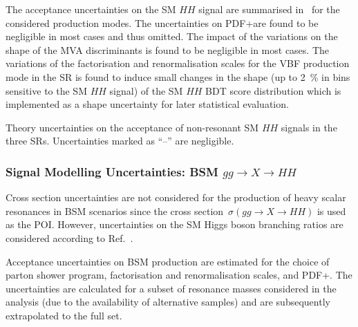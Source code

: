 The acceptance uncertainties on the SM $HH$ signal are summarised
in~ for the considered production modes. The
uncertainties on PDF+\alphas are found to be negligible in most cases and thus
omitted. The impact of the variations on the shape of the MVA discriminants is
found to be negligible in most cases. The variations of the factorisation and
renormalisation scales for the VBF production mode in the \hadhad SR is found to
induce small changes in the shape (up to \SI{2}{\percent} in bins sensitive to
the SM $HH$ signal) of the SM $HH$ BDT score distribution which is implemented
as a shape uncertainty for later statistical evaluation.

\begin{table}[htbp]
  \centering


  \caption{Theory uncertainties on the acceptance of non-resonant SM $HH$
    signals in the three SRs. Uncertainties marked as ``--'' are negligible.}%
  \label{tab:theory_uncertainty_signal}

  
\end{table}


\subsubsection{Signal Modelling Uncertainties: BSM $gg \to X \to HH$}

Cross section uncertainties are not considered for the production of heavy
scalar resonances in BSM scenarios since the cross
section~$\sigma(gg \to X \to HH)$ is used as the POI. However, uncertainties on
the SM Higgs boson branching ratios are considered according to
Ref.~\cite{deFlorian:2016spz}.

Acceptance uncertainties on BSM \HH production are estimated for the choice of
parton shower program, factorisation and renormalisation scales, and
PDF+\alphas. The uncertainties are calculated for a subset of resonance masses
considered in the analysis (due to the availability of alternative samples) and
are subsequently extrapolated to the full set.

